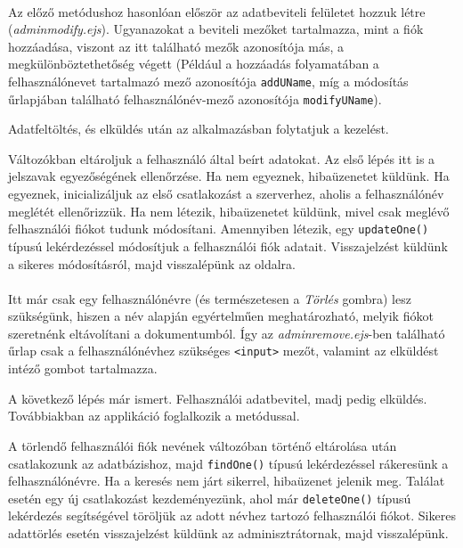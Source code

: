 \\

Az előző metódushoz hasonlóan először az adatbeviteli felületet hozzuk létre (\textit{adminmodify.ejs}). Ugyanazokat a beviteli mezőket tartalmazza, mint a fiók hozzáadása, viszont az itt található mezők azonosítója más, a megkülönböztethetőség végett (Például a hozzáadás folyamatában a felhasználónevet tartalmazó mező azonosítója \texttt{addUName}, míg a módosítás űrlapjában található felhasználónév-mező azonosítója \texttt{modifyUName}).

Adatfeltöltés, és elküldés után az alkalmazásban folytatjuk a kezelést.

Változókban eltároljuk a felhasználó által beírt adatokat. Az első lépés itt is a jelszavak egyezőségének ellenőrzése. Ha nem egyeznek, hibaüzenetet küldünk. Ha egyeznek, inicializáljuk az első csatlakozást a szerverhez, aholis a felhasználónév meglétét ellenőrizzük. Ha nem létezik, hibaüzenetet küldünk, mivel csak meglévő felhasználói fiókot tudunk módosítani. Amennyiben létezik, egy \texttt{updateOne()} típusú lekérdezéssel módosítjuk a felhasználói fiók adatait. Visszajelzést küldünk a sikeres módosításról, majd visszalépünk az oldalra.\\

\\

Itt már csak egy felhasználónévre (és természetesen a \textit{Törlés} gombra) lesz szükségünk, hiszen a név alapján egyértelműen meghatározható, melyik fiókot szeretnénk eltávolítani a dokumentumból. Így az \textit{adminremove.ejs}-ben található űrlap csak a felhasználónévhez szükséges \texttt{<input>} mezőt, valamint az elküldést intéző gombot tartalmazza.

A következő lépés már ismert. Felhasználói adatbevitel, madj pedig elküldés. Továbbiakban az applikáció foglalkozik a metódussal.

A törlendő felhasználói fiók nevének változóban történő eltárolása után csatlakozunk az adatbázishoz, majd \texttt{findOne()} típusú lekérdezéssel rákeresünk a felhasználónévre. Ha a keresés nem járt sikerrel, hibaüzenet jelenik meg. Találat esetén egy új csatlakozást kezdeményezünk, ahol már \texttt{deleteOne()} típusú lekérdezés segítségével töröljük az adott névhez tartozó felhasználói fiókot. Sikeres adattörlés esetén visszajelzést küldünk az adminisztrátornak, majd visszalépünk.


